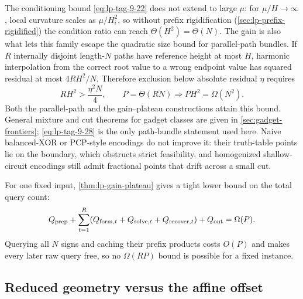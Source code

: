 The conditioning bound \eqref{eq:lp-tag-9-22} does not extend to large
\(\mu\): for \(\mu/H\to\infty\), local curvature scales as \(\mu/H_i^2\), so
without prefix rigidification (\cref{sec:lp-prefix-rigidified}) the
condition ratio can reach \(\Theta(H^2)=\Theta(N)\).  The gain is also what
lets this family escape the quadratic size bound for parallel-path bundles.
If \(R\) internally disjoint length-\(N\) paths have reference height at most
\(H\), harmonic interpolation from the correct root value to a wrong endpoint
value has squared residual at most \(4RH^2/N\).
Therefore exclusion below absolute residual \(\eta\) requires
\begin{equation}
 RH^2>\frac{\eta^2N}{4},\qquad
 P=\Theta(RN)\Longrightarrow PH^2=\Omega(N^2).
\label{eq:lp-tag-9-28}
\end{equation}
Both the parallel-path and the gain--plateau constructions attain this
bound.  General mixture and cut
theorems for gadget classes are given in \cref{sec:gadget-frontiers};
\eqref{eq:lp-tag-9-28} is
the only
path-bundle statement used here.  Naive balanced-XOR or PCP-style
encodings do not improve it: their truth-table points lie on the boundary,
which obstructs strict feasibility, and homogenized shallow-circuit encodings
still admit fractional points that drift across a small cut.

For one fixed input, \cref{thm:lp-gain-plateau} gives a tight lower
bound on the total query count:
\begin{equation}
 Q_{\rm prep}+\sum_{t=1}^R
 (Q_{{\rm form},t}+Q_{{\rm solve},t}+Q_{{\rm recover},t})+Q_{\rm out}
 =\Omega(P).
\label{eq:lp-tag-9-29}
\end{equation}
Querying all \(N\) signs and
caching their prefix products costs \(O(P)\) and makes every later raw query
free, so no \(\Omega(RP)\) bound is possible for a fixed instance.

\subsection{Reduced geometry versus the affine offset}
\label{sec:lp-affine-separation}

